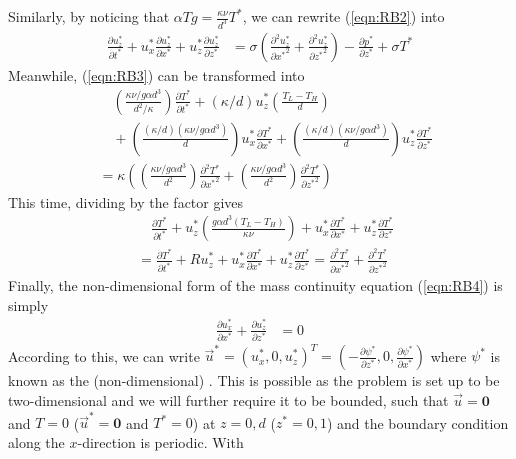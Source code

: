 Similarly, by noticing that $\alpha T g = \frac{\kappa\nu}{d^3} T^*$, we can rewrite (\ref{eqn:RB2}) into
\begin{align}
\frac{\partial u_z^*}{\partial t^*} + u_x^*\frac{\partial u_z^*}{\partial x^*} + u_z^* \frac{\partial u_z^*}{\partial z^*} &= \sigma\left(\frac{\partial^2 u_z^*}{\partial {x^*}^2} + \frac{\partial^2 u_z^*}{\partial {z^*}^2}\right) - \frac{\partial p^*}{\partial z^*} + \sigma T^* \label{eqn:RB2n}
\end{align}
Meanwhile, (\ref{eqn:RB3}) can be transformed into
\begin{align*}
&\quad \left(\frac{\kappa\nu/g\alpha d^3}{d^2/\kappa}\right)\frac{\partial T^*}{\partial t^*} + (\kappa/d)u_z^* \left(\frac{T_L - T_H}{d}\right) \\
&\quad + \left(\frac{(\kappa/d)(\kappa\nu/g\alpha d^3)}{d}\right)u_x^*\frac{\partial T^*}{\partial x^*} + \left(\frac{(\kappa/d)(\kappa\nu/g\alpha d^3)}{d}\right)u_z^*\frac{\partial T^*}{\partial z^*} \\
&= \kappa \left(\left(\frac{\kappa\nu/g\alpha d^3}{d^2}\right)\frac{\partial^2 T^*}{\partial {x^*}^2} + \left(\frac{\kappa\nu/g\alpha d^3}{d^2}\right)\frac{\partial^2 T^*}{\partial {z^*}^2}\right)  
\end{align*}
This time, dividing by the factor  gives
\begin{align}
&\quad \frac{\partial T^*}{\partial t^*} + u_z^* \left(\frac{g\alpha d^3(T_L - T_H)}{\kappa\nu}\right) + u_x^*\frac{\partial T^*}{\partial x^*} + u_z^*\frac{\partial T^*}{\partial z^*} \nonumber \\
&= \frac{\partial T^*}{\partial t^*} + R u_z^* + u_x^*\frac{\partial T^*}{\partial x^*} + u_z^*\frac{\partial T^*}{\partial z^*} = \frac{\partial^2 T^*}{\partial {x^*}^2} + \frac{\partial^2 T^*}{\partial {z^*}^2} \label{eqn:RB3n}
\end{align}
Finally, the non-dimensional form of the mass continuity equation (\ref{eqn:RB4}) is simply
\begin{align}
\frac{\partial u_x^*}{\partial x^*} + \frac{\partial u_z^*}{\partial z^*} &= 0 \label{eqn:loreznmasscont}
\end{align}
According to this, we can write $\vec{u}^* = (u_x^*, 0, u_z^*)^T = (-\frac{\partial \psi^*}{\partial z^*}, 0, \frac{\partial \psi^*}{\partial x^*})$ where $\psi^*$ is known as the (non-dimensional) . This is possible as the problem is set up to be two-dimensional and we will further require it to be bounded, such that $\vec{u} = \textbf{0}$ and $T = 0$ ($\vec{u}^* = \textbf{0}$ and $T^* = 0$) at $z = 0,d$ ($z^* = 0,1$) and the boundary condition along the $x$-direction is periodic. With
